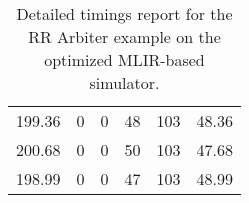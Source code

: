 \begin{table}[h]
{\begin{tabular}{cccccc}
            199.36             & 0                          & 0                          & 48                         & 103                        & 48.36                  \\
            200.68             & 0                          & 0                          & 50                         & 103                        & 47.68                  \\
            198.99             & 0                          & 0                          & 47                         & 103                        & 48.99                  \\
            \bottomrule
        \end{tabular}
    }
    \caption{Detailed timings report for the RR Arbiter example on the optimized MLIR-based simulator.}
\end{table}

